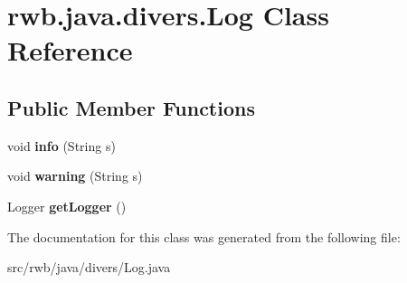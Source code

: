 \hypertarget{classrwb_1_1java_1_1divers_1_1_log}{}\section{rwb.\+java.\+divers.\+Log Class Reference}
\label{classrwb_1_1java_1_1divers_1_1_log}
\subsection*{Public Member Functions}
\begin{DoxyCompactItemize}
\item 
\mbox{\label{classrwb_1_1java_1_1divers_1_1_log_a32e943365e79a440da58ec7e1ac70b92}} 
void {\bfseries info} (String s)
\item 
\mbox{\label{classrwb_1_1java_1_1divers_1_1_log_a18665fe79ee4d91283e65d7aea6b6979}} 
void {\bfseries warning} (String s)
\item 
\mbox{\label{classrwb_1_1java_1_1divers_1_1_log_a892b9255ecc58c7b715b9a63a1a1dfe7}} 
Logger {\bfseries get\+Logger} ()
\end{DoxyCompactItemize}


The documentation for this class was generated from the following file\+:\begin{DoxyCompactItemize}
\item 
src/rwb/java/divers/Log.\+java\end{DoxyCompactItemize}
